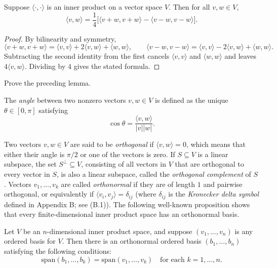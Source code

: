 \begin{lemma}
\label{lem:polarization-identity}
\leanok
{}
Suppose $\langle \cdot,\cdot \rangle$ is an inner product on a vector space $V$. Then for all $v, w \in V$,
$$\langle v,w \rangle = \frac{1}{4}\bigl[\langle v+w, v+w \rangle - \langle v-w, v-w \rangle\bigr].$$
\end{lemma}

\begin{proof}
\leanok
By bilinearity and symmetry,
\[
\langle v+w, v+w \rangle = \langle v,v \rangle + 2\langle v,w \rangle + \langle w,w \rangle,
\qquad
\langle v-w, v-w \rangle = \langle v,v \rangle - 2\langle v,w \rangle + \langle w,w \rangle .
\]
Subtracting the second identity from the first cancels $\langle v,v\rangle$ and $\langle w,w\rangle$ and leaves $4\langle v,w\rangle$. Dividing by $4$ gives the stated formula.
\end{proof}

\begin{exercise}
\label{exer:polarization-proof}
\leanok
{}
Prove the preceding lemma.
\end{exercise}

The \textit{angle} between two nonzero vectors $v, w \in V$ is defined as the unique $\theta \in [0,\pi]$ satisfying
$$\cos \theta = \frac{\langle v,w \rangle}{|v||w|}.$$

Two vectors $v, w \in V$ are said to be \textit{orthogonal} if $\langle v,w \rangle = 0$, which means that either their angle is $\pi/2$ or one of the vectors is zero. If $S \subseteq V$ is a linear subspace, the set $S^\perp \subseteq V$, consisting of all vectors in $V$ that are orthogonal to every vector in $S$, is also a linear subspace, called the \textit{orthogonal complement} of $S$. Vectors $v_1,\ldots,v_k$ are called \textit{orthonormal} if they are of length $1$ and pairwise orthogonal, or equivalently if $\langle v_i, v_j \rangle = \delta_{ij}$ (where $\delta_{ij}$ is the \textit{Kronecker delta symbol} defined in Appendix B; see (B.1)). The following well-known proposition shows that every finite-dimensional inner product space has an orthonormal basis.

\begin{proposition}
\label{prop:gram-schmidt}
\leanok
{}
Let $V$ be an $n$-dimensional inner product space, and suppose $(v_1,\ldots,v_n)$ is any ordered basis for $V$. Then there is an orthonormal ordered basis $(b_1,\ldots,b_n)$ satisfying the following conditions:
$$\text{span}(b_1,\ldots,b_k) = \text{span}(v_1,\ldots,v_k) \quad \text{for each } k = 1,\ldots,n.$$
\end{proposition}

